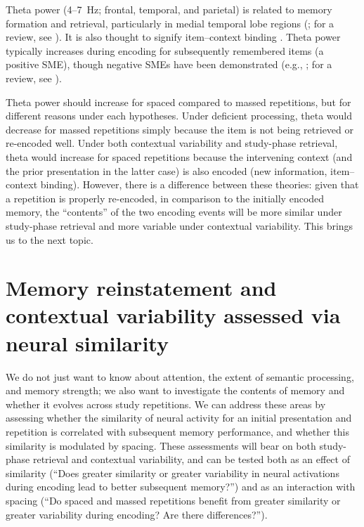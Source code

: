 Theta power (4--7~Hz; frontal, temporal, and parietal) is related to memory formation and retrieval, particularly in medial temporal lobe regions (; for a review, see ).  It is also thought to signify item--context binding \cite{HansEtal2009a,HansEtal2011a,StauHans2013,SummMang2005}.  Theta power typically increases during encoding for subsequently remembered items (a positive SME), though negative SMEs have been demonstrated (e.g., ; for a review, see ).

Theta power should increase for spaced compared to massed repetitions, but for different reasons under each hypotheses.  Under deficient processing, theta would decrease for massed repetitions simply because the item is not being retrieved or re-encoded well.
Under both contextual variability and study-phase retrieval, theta would increase for spaced repetitions because the intervening context (and the prior presentation in the latter case) is also encoded (new information, item--context binding).
However, there is a difference between these theories: given that a repetition is properly re-encoded, in comparison to the initially encoded memory, the ``contents'' of the two encoding events will be more similar under study-phase retrieval and more variable under contextual variability.  This brings us to the next topic.




\section{Memory reinstatement and contextual variability assessed via neural similarity}

We do not just want to know about attention, the extent of semantic processing, and memory strength; we also want to investigate the contents of memory and whether it evolves across study repetitions.
We can address these areas by assessing whether the similarity of neural activity for an initial presentation and repetition is correlated with subsequent memory performance, and whether this similarity is modulated by spacing.  These assessments will bear on both study-phase retrieval and contextual variability, and can be tested both as an effect of similarity (``Does greater similarity or greater variability in neural activations during encoding lead to better subsequent memory?'') and as an interaction with spacing (``Do spaced and massed repetitions benefit from greater similarity or greater variability during encoding?  Are there differences?'').

